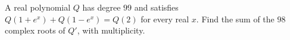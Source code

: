 A real polynomial $Q$ has degree $99$ and satisfies $Q(1+e^x)+Q(1-e^x)=Q(2)$ for every real $x$. Find the sum of the $98$ complex roots of $Q\prime$, with multiplicity.

